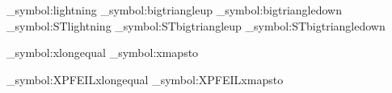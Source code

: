 {{{{   \DeclareRobustCommand{\CMLLshpos}{\textCMLL{\char1}}
   \DeclareRobustCommand{\CMLLshneg}{\textCMLL{\char2}}
   \DeclareRobustCommand{\CMLLshift}{\textCMLL{\char3}}
   \DeclareRobustCommand{\CMLLcoh}{\textCMLL{\char4}}
   \DeclareRobustCommand{\CMLLscoh}{\textCMLL{\char5}}
   \DeclareRobustCommand{\CMLLincoh}{\textCMLL{\char6}}
   \DeclareRobustCommand{\CMLLsincoh}{\textCMLL{\char7}}
   \DeclareRobustCommand{\CMLLbigwith}{\raisebox{2ex}{\textCMLL{\char8}}}
   \DeclareRobustCommand{\CMLLbigparr}{\raisebox{2ex}{\textCMLL{\char10}}}
  }
  {}
\ExplSyntaxOn
 \newif\ifST
 \newcommand\ST{\pkgname{stmaryrd}}
  {\STtrue
   \save_symbol:{lightning}
   \save_symbol:{bigtriangleup} \save_symbol:{bigtriangledown}
   \RequirePackage{stmaryrd}
   \restore_symbol:{ST}{lightning}
   \restore_symbol:{ST}{bigtriangleup} \restore_symbol:{ST}{bigtriangledown}
  }
  {}
\ExplSyntaxOff
\ExplSyntaxOn
\newif\ifXPFEIL
\newcommand\XPFEIL{\pkgname{extpfeil}}
  {\XPFEILtrue
   \let\origRequirePackage=\RequirePackage
   \renewcommand*{\RequirePackage}[2][]{}
   \save_symbol:{xlongequal}
   \save_symbol:{xmapsto}
   \RequirePackage{extpfeil}
   \restore_symbol:{XPFEIL}{xlongequal}
   \restore_symbol:{XPFEIL}{xmapsto}
   \let\RequirePackage=\origRequirePackage
  }
  {}
\ExplSyntaxOff
\iffalse
\newif\ifEU
\IfStyFileExists{euscript}
  {\EUtrue\RequirePackage[mathcal]{euscript}
   \renewcommand{\mathcal}[1]{\mbox{\usefont{U}{eus}{m}{n}##1}}
  }
  {\let\CMcal\mathcal}
\fi
  \newif\ifBM
    {\BMtrue
      \RequirePackage{bm}
    }
   {}
\ifUNICODE
 \else
{}
  {\newcommand{\mathbbm}[1]{\mbox{\usefont{U}{bbm}{m}{n}##1}}
   \newcommand{\mathbbmss}[1]{\mbox{\usefont{U}{bbmss}{m}{n}##1}}
   \newcommand{\mathbbmtt}[1]{\mbox{\usefont{U}{bbmtt}{m}{n}##1}}}
  {}
\fi
\ifUNICODE
\else
{}
  {
  \newcommand{\BBmathbb}[1]{\mbox{\usefont{U}{bbold}{m}{n}##1}}
   \newcommand{\BBsym}[1]{\ensuremath{\BBmathbb{\char##1}}}
   \newcommand{\Langle}{\BBsym{`<}}
   \newcommand{\Lbrack}{\BBsym{`[}}
   \newcommand{\Lparen}{\BBsym{`(}}
   \newcommand{\bbalpha}{\BBsym{"0B}}
   \newcommand{\bbbeta}{\BBsym{"0C}}
   \newcommand{\bbgamma}{\BBsym{"0D}}
   \newcommand{\Rparen}{\BBsym{`)}}
   \newcommand{\Rbrack}{\BBsym{`]}}
   \newcommand{\Rangle}{\BBsym{"3E}}
  }
  {}
\fi
{}
  {\newcommand{\MBBmathbb}[1]{\mbox{\usefont{OT1}{mbb}{m}{n}##1}}}
  {}
\ifx\MBBmathbb\undefined
\else
  \newcommand{\bbnabla}{\MBBmathbb{\char"9A}}
  \newcommand{\bbdollar}{\MBBmathbb{\char"24}}
  \newcommand{\bbeuro}{\MBBmathbb{\char"FB}}
  \newcommand{\bbpe}{\MBBmathbb{\char"D4}}
  \newcommand{\bbqof}{\MBBmathbb{\char"D7}}
  \newcommand{\bbyod}{\MBBmathbb{\char"C9}}
  \newcommand{\bbfinalnun}{\MBBmathbb{\char"CF}}

}}}
